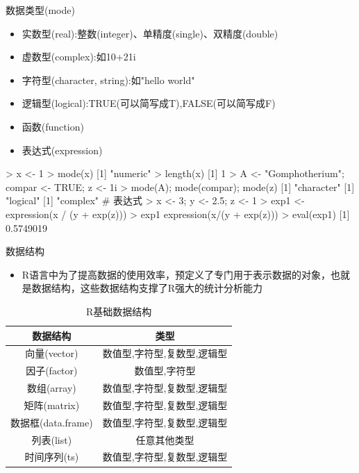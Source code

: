 \documentclass{beamerthemeMono}
\begin{document}
\begin{frame}[t, fragile]{\subsecname}{数据类型(mode)}
  \begin{itemize}
  \item 实数型(real):整数(integer)、单精度(single)、双精度(double)
  \item 虚数型(complex):如10+21i
  \item 字符型(character, string):如"hello world"
  \item 逻辑型(logical):TRUE(可以简写成T),FALSE(可以简写成F)
  \item 函数(function)
  \item 表达式(expression)
  \end{itemize}

\begin{overlayarea}{\textwidth}{\textheight}
\begin{rcode}
> x <- 1
> mode(x)
[1] "numeric"
> length(x)
[1] 1
> A <- "Gomphotherium"; compar <- TRUE; z <- 1i
> mode(A); mode(compar); mode(z)
[1] "character"
[1] "logical"
[1] "complex"
# 表达式
> x <- 3; y <- 2.5; z <- 1
> exp1 <- expression(x / (y + exp(z)))
> exp1
expression(x/(y + exp(z)))
> eval(exp1)
[1] 0.5749019
\end{rcode}
\end{overlayarea}
\end{frame}

\begin{frame}[t]{\subsecname}{数据结构}
  \begin{itemize}
  \item R语言中为了提高数据的使用效率，预定义了专门用于表示数据的对象，也就是数据结构，这些数据结构支撑了R强大的统计分析能力
  \end{itemize}
  \begin{table} \centering \small
    \begin{tabular}{|c|c|}
      \toprule
      \rowcolor{LightCyan}
      数据结构 & 类型\\\hline
      向量(vector) & 数值型,字符型,复数型,逻辑型\\\hline
      因子(factor) & 数值型,字符型\\\hline
      数组(array) & 数值型,字符型,复数型,逻辑型\\\hline
      矩阵(matrix) & 数值型,字符型,复数型,逻辑型 \\\hline
      数据框(data.frame) & 数值型,字符型,复数型,逻辑型 \\\hline
      列表(list) & 任意其他类型 \\\hline
      时间序列(ts) & 数值型,字符型,复数型,逻辑型\\
      \bottomrule
    \end{tabular}
    \caption{R基础数据结构}
  \end{table}
\end{frame}
\end{document}
